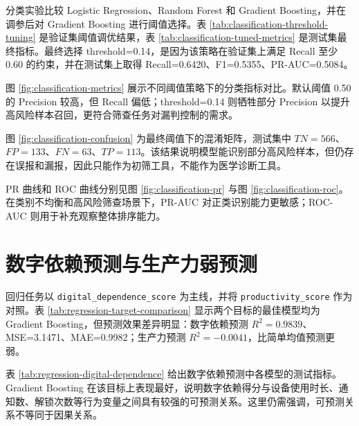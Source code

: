 分类实验比较 Logistic Regression、Random Forest 和 Gradient Boosting，并在调参后对 Gradient Boosting 进行阈值选择。表 \ref{tab:classification-threshold-tuning} 是验证集阈值调优结果，表 \ref{tab:classification-tuned-metrics} 是测试集最终指标。最终选择 threshold=0.14，是因为该策略在验证集上满足 Recall 至少 0.60 的约束，并在测试集上取得 Recall=0.6420、F1=0.5355、PR-AUC=0.5084。





图 \ref{fig:classification-metrics} 展示不同阈值策略下的分类指标对比。默认阈值 0.50 的 Precision 较高，但 Recall 偏低；threshold=0.14 则牺牲部分 Precision 以提升高风险样本召回，更符合筛查任务对漏判控制的需求。


图 \ref{fig:classification-confusion} 为最终阈值下的混淆矩阵，测试集中 $TN=566$、$FP=133$、$FN=63$、$TP=113$。该结果说明模型能识别部分高风险样本，但仍存在误报和漏报，因此只能作为初筛工具，不能作为医学诊断工具。


PR 曲线和 ROC 曲线分别见图 \ref{fig:classification-pr} 与图 \ref{fig:classification-roc}。在类别不均衡和高风险筛查场景下，PR-AUC 对正类识别能力更敏感；ROC-AUC 则用于补充观察整体排序能力。



\section{数字依赖预测与生产力弱预测}

回归任务以 \texttt{digital\_dependence\_score} 为主线，并将 \texttt{productivity\_score} 作为对照。表 \ref{tab:regression-target-comparison} 显示两个目标的最佳模型均为 Gradient Boosting，但预测效果差异明显：数字依赖预测 $R^2=0.9839$、MSE=3.1471、MAE=0.9982；生产力预测 $R^2=-0.0041$，比简单均值预测更弱。



表 \ref{tab:regression-digital-dependence} 给出数字依赖预测中各模型的测试指标。Gradient Boosting 在该目标上表现最好，说明数字依赖得分与设备使用时长、通知数、解锁次数等行为变量之间具有较强的可预测关系。这里仍需强调，可预测关系不等同于因果关系。

